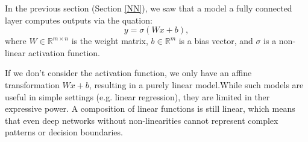 

In the previous section (Section \ref{NN}), we saw that a model  a fully connected layer computes outputs via the quation: \[y = \sigma(Wx+b),\] 
where $W\in \mathbb{R}^{m\times n}$ is the weight matrix, $b\in \mathbb{R}^m$ is a bias vector, and $\sigma$ is a non-linear activation function.





If we don't consider the activation function, we only have an affine transformation  $Wx+b$, resulting in a purely linear model.While such models are useful in simple settings (e.g. linear regression), they are limited in ther expressive power.
A composition of linear functions is still linear, which means that even deep networks without non-linearities cannot represent complex patterns or decision boundaries. 

